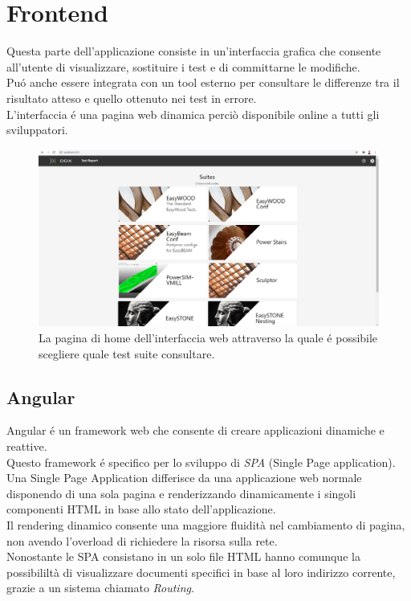 \chapter{Frontend}
    Questa parte dell'applicazione consiste in un'interfaccia grafica che consente all'utente di visualizzare, sostituire i test e di committarne le modifiche.\\
    Pu\'o anche essere integrata con un tool esterno per consultare le differenze tra il risultato atteso e quello ottenuto nei test in errore.\\
    L'interfaccia \'e una pagina web dinamica perciò disponibile online a tutti gli sviluppatori.\\
    \begin{figure}[h]
        \includegraphics[width=\textwidth]{images/homepage.png}
        \caption{La pagina di home dell'interfaccia web attraverso la quale \'e possibile scegliere quale test suite consultare.}
    \end{figure}
    \section{Angular}
        Angular \'e un framework web che consente di creare applicazioni dinamiche e reattive.    \\
        Questo framework \'e specifico per lo sviluppo di \textit{SPA} (Single Page application).\\
        Una Single Page Application differisce da una applicazione web normale disponendo di una sola pagina e renderizzando dinamicamente i singoli componenti HTML in base allo stato dell'applicazione.\\
        Il rendering dinamico consente una maggiore fluidità nel cambiamento di pagina, non avendo l'overload di richiedere la risorsa sulla rete.\\
        Nonostante le SPA consistano in un solo file HTML hanno comunque la possibililtà di visualizzare documenti specifici in base al loro indirizzo corrente, grazie a un sistema chiamato \textit{Routing}. \\
